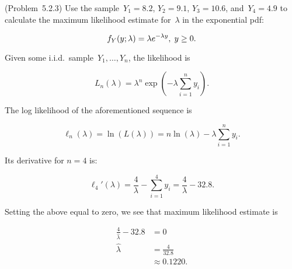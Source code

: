 \begin{problem}
  (\textnormal{Problem~5.2.3}) Use the sample~${Y_1 = 8.2}$, ${Y_2 = 9.1}$, ${Y_3 = 10.6}$, and~${Y_4 = 4.9}$ to calculate the maximum likelihood estimate for~$\lambda$ in the exponential pdf:

  \begin{equation}\label{eq:P02:Exponential}
    f_{Y}(y;\lambda) = \lambda e^{-\lambda y}, \hspace{0.1cm} y \geq 0 \text{.}
  \end{equation}
\end{problem}

Given some i.i.d.\ sample~${Y_{1},\ldots,Y_{n}}$, the likelihood is

\begin{equation}\label{eq:P02:Likelihood}
  L_{n}(\lambda) = \lambda^{n}\exp\left(-\lambda\sum_{i=1}^{n} y_{i}\right)\text{.}
\end{equation}

\noindent
The log likelihood of the aforementioned sequence is

\begin{equation}\label{eq:P02:LogLikelihood}
  \ell_{n}(\lambda) = \ln\left(L(\lambda)\right) = n\ln(\lambda) - \lambda \sum_{i=1}^{n} y_i\text{.}
\end{equation}

\noindent
Its derivative for ${n=4}$ is:

\begin{equation}\label{eq:P02:LogLikelihood:Derivative}
  \ell_{4}'(\lambda) = \frac{4}{\lambda} - \sum_{i=1}^{4} y_i = \frac{4}{\lambda} - 32.8  \text{.}
\end{equation}

\noindent
Setting the above equal to zero, we see that maximum likelihood estimate is

\begin{align}
  \frac{4}{\hat{\lambda}} - 32.8 &= 0 \\
  \hat{\lambda} &= \frac{4}{32.8} \\
                &\approx \boxed{0.1220} \text{.}
\end{align}
